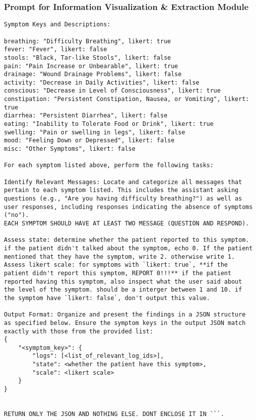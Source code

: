 \subsubsection{Prompt for Information Visualization \& Extraction Module}
\begin{verbatim}
Symptom Keys and Descriptions:

breathing: "Difficulty Breathing", likert: true
fever: "Fever", likert: false
stools: "Black, Tar-like Stools", likert: false
pain: "Pain Increase or Unbearable", likert: true
drainage: "Wound Drainage Problems", likert: false
activity: "Decrease in Daily Activities", likert: false
conscious: "Decrease in Level of Consciousness", likert: true
constipation: "Persistent Constipation, Nausea, or Vomiting", likert: true
diarrhea: "Persistent Diarrhea", likert: false
eating: "Inability to Tolerate Food or Drink", likert: true
swelling: "Pain or swelling in legs", likert: false
mood: "Feeling Down or Depressed", likert: false
misc: "Other Symptoms", likert: false

For each symptom listed above, perform the following tasks:

Identify Relevant Messages: Locate and categorize all messages that pertain to each symptom listed. This includes the assistant asking questions (e.g., "Are you having difficulty breathing?") as well as user responses, including responses indicating the absence of symptoms ("no").
EACH SYMPTOM SHOULD HAVE AT LEAST TWO MESSAGE (QUESTION AND RESPOND).

Assess state: determine whether the patient reported to this symptom. if the patient didn't talked about the symptom, echo 0. If the patient mentioned that they have the symptom, write 2. otherwise write 1.
Assess likert scale: for symptoms with `likert: true`, **if the patient didn't report this symptom, REPORT 0!!!** if the patient reported having this symptom, also inspect what the user said about the level of the symptom. should be a interger between 1 and 10. if the symptom have `likert: false`, don't output this value.

Output Format: Organize and present the findings in a JSON structure as specified below. Ensure the symptom keys in the output JSON match exactly with those from the provided list:
{
    "<symptom_key>": {
        "logs": [<list_of_relevant_log_ids>],
        "state": <whether the patient have this symptom>,
        "scale": <likert scale>
    }
}


RETURN ONLY THE JSON AND NOTHING ELSE. DONT ENCLOSE IT IN ```.
\end{verbatim}

